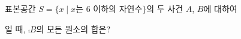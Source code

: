 표본공간 $S=\{x \mid x$는 6 이하의 자연수$\}$의 두 사건 $A$, $B$에 대하여\par\smallskip{}\par\smallskip\noindent 일 때, $\comp{B}$의 모든 원소의 합은?
